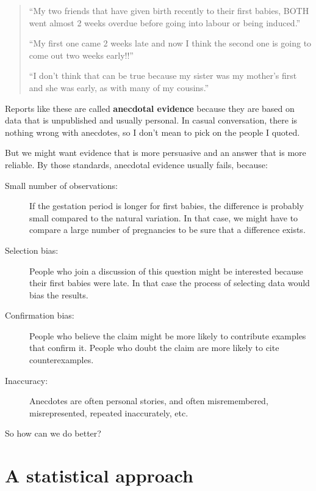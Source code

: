 \documentclass[12pt]{book}
\begin{document}
\begin{quote}

``My two friends that have given birth recently to their first babies,
BOTH went almost 2 weeks overdue before going into labour or being
induced.''

``My first one came 2 weeks late and now I think the second one is
going to come out two weeks early!!''

``I don't think that can be true because my sister was my mother's
first and she was early, as with many of my cousins.''

\end{quote}

Reports like these are called {\bf anecdotal evidence} because they
are based on data that is unpublished and usually personal.  In casual
conversation, there is nothing wrong with anecdotes, so I don't mean
to pick on the people I quoted.

But we might want evidence that is more persuasive and
an answer that is more reliable.  By those standards, anecdotal
evidence usually fails, because:

\begin{description}

\item[Small number of observations:] If the gestation period is longer
  for first babies, the difference is probably small compared to the
  natural variation.  In that case, we might have to compare a large
  number of pregnancies to be sure that a difference exists.

\item[Selection bias:] People who join a discussion of this question
  might be interested because their first babies were late.  In that
  case the process of selecting data would bias the results.

\item[Confirmation bias:] People who believe the claim might be more
  likely to contribute examples that confirm it.  People who doubt the
  claim are more likely to cite counterexamples.

\item[Inaccuracy:] Anecdotes are often personal stories, and often
  misremembered, misrepresented, repeated
  inaccurately, etc.

\end{description}

So how can we do better?

\section{A statistical approach}
\end{document}
